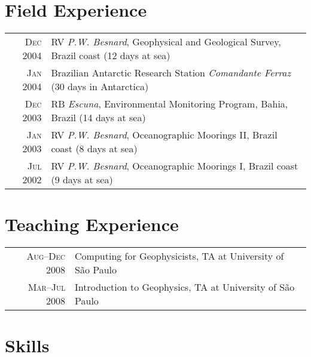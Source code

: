 \documentclass[a4paper,11pt]{article}
\begin{document}

\section{Field Experience}

\begin{tabular}{rl}
\textsc{Dec} 2004 & RV \emph{P.W. Besnard}, Geophysical and Geological Survey, Brazil coast \footnotesize{(12 days at sea)}\\
\textsc{Jan} 2004 & Brazilian Antarctic Research Station \emph{Comandante Ferraz} \footnotesize{(30 days in Antarctica)}\\
\textsc{Dec} 2003 & RB \emph{Escuna}, Environmental Monitoring Program, Bahia, Brazil \footnotesize{(14 days at sea)}\\
\textsc{Jan} 2003 & RV \emph{P.W. Besnard}, Oceanographic Moorings II, Brazil coast \footnotesize{(8 days at sea)}\\
\textsc{Jul} 2002 & RV \emph{P.W. Besnard}, Oceanographic Moorings I, Brazil coast \footnotesize{(9 days at sea)}
\end{tabular}


\section{Teaching Experience}

\begin{tabular}{rl}
\textsc{Aug--Dec} 2008 & Computing for Geophysicists, TA at University of S\~ao Paulo\\
\textsc{Mar--Jul} 2008 & Introduction to Geophysics, TA at University of S\~ao Paulo
\end{tabular}


\section{Skills}
\end{document}
